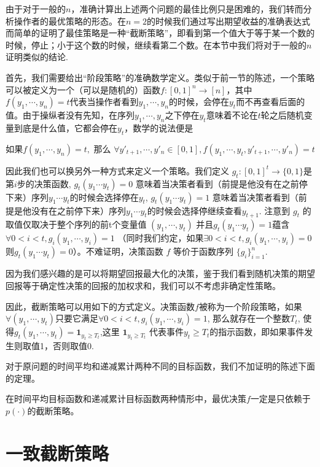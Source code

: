 \documentclass[bachelor]{thuthesis}
\begin{document}
由于对于一般的$n$，准确计算出上述两个问题的最佳比例只是困难的，我们转而分析操作者的最优策略的形态。在$n=2$的时候我们通过写出期望收益的准确表达式而简单的证明了最佳策略是一种“截断策略”，即看到第一个值大于等于某一个数的时候，停止；小于这个数的时候，继续看第二个数。在本节中我们将对于一般的$n$证明类似的结论.

首先，我们需要给出“阶段策略”的准确数学定义。类似于前一节的陈述，一个策略可以被定义为一个（可以是随机的）函数$f:[0,1]^n\to [n]$，其中$f(y_1,\cdots,y_n)=t$代表当操作者看到$y_1,\cdots,y_n$的时候，会停在$y_t$而不再查看后面的值。由于操纵者没有先知，在序列$y_1,\cdots,y_n$之下停在$y_t$意味着不论在$t$轮之后随机变量到底是什么值，它都会停在$y_t$，数学的说法便是

\[\text{如果}f(y_1,\cdots,y_n)=t, \text{ 那么 }\forall y'_{t+1},\cdots, y'_{n}\in [0,1],f(y_1,\cdots, y_t,y'_{t+1},\cdots,y'_n)=t \]

因此我们也可以换另外一种方式来定义一个策略。我们定义 $g_t:[0,1]^t\to \{0,1\}$是第$i$步的决策函数, $g_t(y_1\cdots y_t)=0$ 意味着当决策者看到（前提是他没有在之前停下来）序列$y_1\cdots y_t$的时候会选择停在$y_t$, $g_t(y_1\cdots y_t)=1$ 意味着当决策者看到（前提是他没有在之前停下来）序列$y_1\cdots y_t$的时候会选择停继续查看$y_{t+1}$. 注意到 $g_t$ 的取值仅取决于整个序列的前t个变量值 $(y_1,\cdots,y_t)$ 并且$g_t(y_1\cdots y_t)=1$蕴含$\forall 0<i<t, g_i(y_1,\cdots,y_i)=1$ （同时我们约定，如果$\exists 0<i<t, g_i(y_1,\cdots,y_i)=0$则$g_t(y_1\cdots y_t)=0$）。不难证明，决策函数 $f$ 等价于函数序列 $\{g_i\}_{i=1}^{n}$.

因为我们感兴趣的是可以将期望回报最大化的决策，鉴于我们看到随机决策的期望回报等于确定性决策的回报的加权求和，我们可以不考虑非确定性策略。

因此，截断策略可以用如下的方式定义。决策函数$f$被称为一个阶段策略，如果$\forall(y_1,\cdots,y_t)$只要它满足$\forall 0<i<t, g_i(y_1,\cdots,y_i)=1$, 那么就存在一个整数$T_t$, 使得$g_t(y_1,\cdots,y_t)=\textbf{1}_{y_t\ge T_t}$,这里 $\textbf{1}_{y_t\ge T_t}$ 代表事件$y_t\ge T_t$的指示函数，即如果事件发生则取值1，否则取值0.

对于原问题的时间平均和递减累计两种不同的目标函数，我们不加证明的陈述下面的定理。

\begin{theorem}

在时间平均目标函数和递减累计目标函数两种情形中，最优决策$f$一定是只依赖于$p(\cdot)$的截断策略。

\end{theorem}

\section{一致截断策略}
\end{document}
